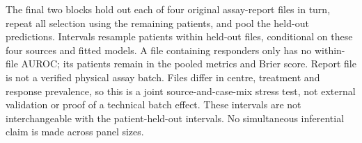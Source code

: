 The final two blocks hold out each of four original assay-report files in turn, repeat all selection using the remaining patients, and pool the held-out predictions. Intervals resample patients within held-out files, conditional on these four sources and fitted models. A file containing responders only has no within-file AUROC; its patients remain in the pooled metrics and Brier score. Report file is not a verified physical assay batch. Files differ in centre, treatment and response prevalence, so this is a joint source-and-case-mix stress test, not external validation or proof of a technical batch effect. These intervals are not interchangeable with the patient-held-out intervals. No simultaneous inferential claim is made across panel sizes.\normalsize
